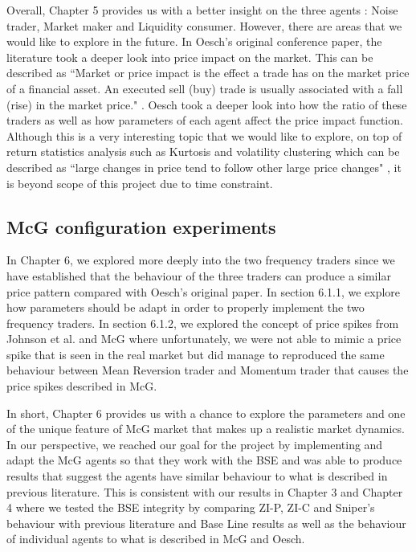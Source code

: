 Overall, Chapter 5 provides us with a better insight on the three agents : Noise trader, Market maker and Liquidity consumer. However, there are areas that we would like to explore in the future. In Oesch's original conference paper, the literature took a deeper look into price impact on the market. This can be described as ``Market or price impact is the effect a trade has on the market price of a financial asset. An executed sell (buy) trade is usually associated with a fall (rise) in the market price." \cite{Oesch}. Oesch took a deeper look into how the ratio of these traders as well as how parameters of each agent affect the price impact function. Although this is a very interesting topic that we would like to explore, on top of return statistics analysis such as Kurtosis and volatility clustering which can be described as ``large changes in price tend to follow other large price changes" \cite{McGroarty}, it is beyond scope of this project due to time constraint. 

\subsection{McG configuration experiments}
In Chapter 6, we explored more deeply into the two frequency traders since we have established that the behaviour of the three traders can produce a similar price pattern compared with Oesch's original paper. In section 6.1.1, we explore how parameters should be adapt in order to properly implement the two frequency traders. In section 6.1.2, we explored the concept of price spikes from Johnson et al. \cite{Johnson} and McG\cite{McGroarty} where unfortunately, we were not able to mimic a price spike that is seen in the real market but did manage to reproduced the same behaviour between Mean Reversion trader and Momentum trader that causes the price spikes described in McG. 

In short, Chapter 6 provides us with a chance to explore the parameters and one of the unique feature of McG market that makes up a realistic market dynamics. In our perspective, we reached our goal for the project by implementing and adapt the McG agents so that they work with the BSE and was able to produce results that suggest the agents have similar behaviour to what is described in previous literature. This is consistent with our results in Chapter 3 and Chapter 4 where we tested the BSE integrity by comparing ZI-P, ZI-C and Sniper's behaviour with previous literature and Base Line results as well as the behaviour of individual agents to what is described in McG and Oesch. 

